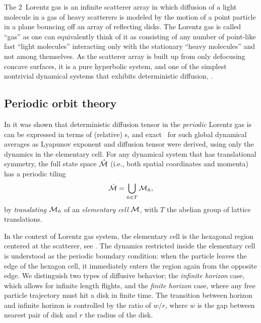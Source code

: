\documentclass[aps,pre,
                showpacs,
                twocolumn,
                groupedaddress,
                floatfix]{revtex4-1}
\begin{document}
The $2$\dmn\ Lorentz gas is an infinite scatterer array in which diffusion of a
light molecule in a gas of heavy scatterers is modeled by the motion of a point
particle in a plane bouncing off an array of reflecting disks. The Lorentz gas
is called ``gas'' as one can equivalently think of it as consisting of any
number of point-like fast ``light molecules'' interacting only with the
stationary ``heavy molecules'' and not among themselves.  As the scatterer array
is built up from only defocusing concave surfaces, it is a pure hyperbolic
system, and one of the simplest nontrivial dynamical systems that exhibits
deterministic diffusion, .


\subsection{Periodic orbit theory}


In  it was shown that deterministic
diffusion tensor in the {\em periodic} Lorentz gas is can be expressed in terms
of (relative) \po s, and exact \cycForm\ for such global dynamical averages as
Lyapunov exponent and diffusion tensor were derived, using only the dynamics in
the elementary cell. For any dynamical system that has translational symmetry,
the full state space $\hat {{\cal M}}$ (i.e., both spatial coordinates and momenta) has a
periodic tiling \[\hat {{\cal M}}=\bigcup_{ \hat n \in T} {\cal M}_{\hat n},\] by {\em translating}
${\cal M}_{\hat n}$ of an {\em elementary cell} ${\cal M}$, with $T$ the abelian group of
lattice translations.

In the context of Lorentz gas system, the elementary cell is the hexagonal
region centered at the scatterer, see . The dynamics
restricted inside the elementary cell is understood as the periodic boundary
condition: when the particle leaves the edge of the hexagon cell, it immediately
enters the region again from the opposite edge. We distinguish two types of
diffusive behavior; the {\em infinite horizon} case, which allows for infinite
length flights, and the {\em finite horizon} case, where any free particle
trajectory must hit a disk in finite time. The transition between horizon and
infinite horizon is controlled by the ratio of $w/r$, where $w$ is the gap
between nearest pair of disk and $r$ the radius of the disk.
\end{document}
